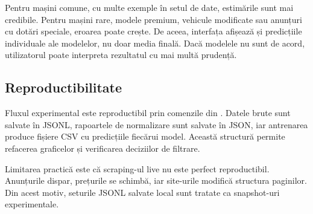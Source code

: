 Pentru mașini comune, cu multe exemple în setul de date, estimările sunt mai credibile. Pentru mașini rare, modele premium, vehicule modificate sau anunțuri cu dotări speciale, eroarea poate crește. De aceea, interfața afișează și predicțiile individuale ale modelelor, nu doar media finală. Dacă modelele nu sunt de acord, utilizatorul poate interpreta rezultatul cu mai multă prudență.

\subsection{Reproductibilitate}
\label{sec:evaluation-reproducibility}

Fluxul experimental este reproductibil prin comenzile din . Datele brute sunt salvate în JSONL, rapoartele de normalizare sunt salvate în JSON, iar antrenarea produce fișiere CSV cu predicțiile fiecărui model. Această structură permite refacerea graficelor și verificarea deciziilor de filtrare.

Limitarea practică este că scraping-ul live nu este perfect reproductibil. Anunțurile dispar, prețurile se schimbă, iar site-urile modifică structura paginilor. Din acest motiv, seturile JSONL salvate local sunt tratate ca snapshot-uri experimentale.
